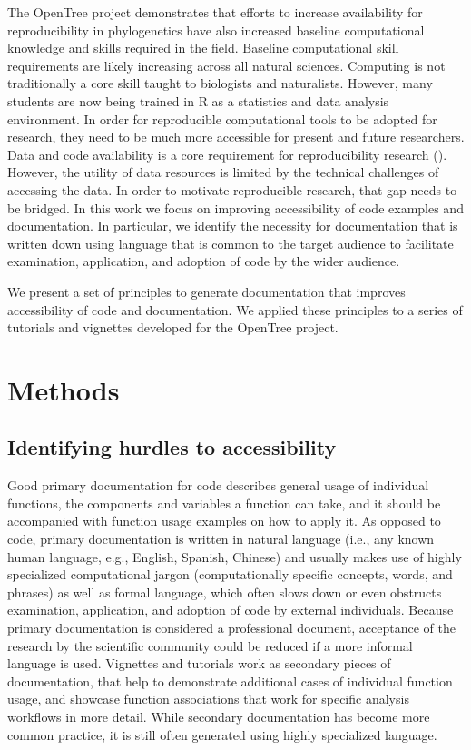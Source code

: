 \documentclass[12pt]{article}
\begin{document}
The OpenTree project demonstrates that efforts to increase availability for reproducibility
in phylogenetics have also increased baseline computational knowledge and skills
required in the field.
Baseline computational skill requirements are likely increasing across all natural sciences.
Computing is not traditionally a core skill taught to biologists and naturalists.
However, many students are now being trained in R as a statistics and data analysis environment.
In order for reproducible computational tools to be adopted for research, they
 need to be much more accessible for present and future researchers.
Data and code availability is a core requirement for reproducibility research
 (\cite{peng2011reproducible, sandve2013ten, powers2019open}).
However, the utility of data resources is limited by the technical challenges of accessing the data.
In order to motivate reproducible research, that gap needs to be bridged.
In this work we focus on improving accessibility of code examples and documentation.
In particular, we identify the necessity for documentation that is written down
 using language that is common to the target audience to facilitate examination,
  application, and adoption of code by the wider audience.

We present a set of principles to generate documentation that improves accessibility
 of code and documentation. We applied these principles to a series of tutorials
  and vignettes developed for the OpenTree project.

\section{Methods}
\label{sec:meth}
\subsection*{Identifying hurdles to accessibility}

Good primary documentation for code describes general usage of individual functions,
 the components and variables a function can take, and it should be accompanied with
  function usage examples on how to apply it.
As opposed to code, primary documentation is written in natural language (i.e.,
 any known human language, e.g., English, Spanish, Chinese) and usually makes use
  of highly specialized computational jargon (computationally specific concepts,
   words, and phrases) as well as formal language, which often slows down or even
    obstructs examination, application, and adoption of code by external individuals.
Because primary documentation is considered a professional document, acceptance
 of the research by the scientific community could be reduced if a more informal
  language is used.
Vignettes and tutorials work as secondary pieces of documentation, that help to demonstrate
 additional cases of individual function usage, and showcase function associations
  that work for specific analysis workflows in more detail.
   While secondary documentation has become more common practice,
    it is still often generated using highly specialized language.
\end{document}
